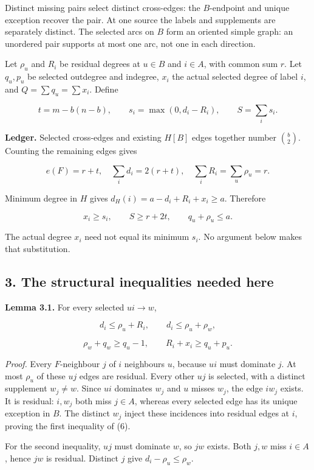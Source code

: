 \documentclass[
  11pt,
  a4paper,
]{article}
\begin{document}
Distinct missing pairs select distinct cross-edges: the \(B\)-endpoint
and unique exception recover the pair. At one source the labels and
supplements are separately distinct. The selected arcs on \(B\) form an
oriented simple graph: an unordered pair supports at most one arc, not
one in each direction.

Let \(\rho_u\) and \(R_i\) be residual degrees at \(u\in B\) and
\(i\in A\), with common sum \(r\). Let \(q_u,p_u\) be selected outdegree
and indegree, \(x_i\) the actual selected degree of label \(i\), and
\(Q=\sum q_u=\sum x_i\). Define

\[t=m-b(n-b),\qquad s_i=\max(0,d_i-R_i),\qquad S=\sum_i s_i.\]

\textbf{Ledger.} Selected cross-edges and existing \(H[B]\) edges
together number \(\binom b2\). Counting the remaining edges gives

\[e(F)=r+t,\quad \sum_i d_i=2(r+t),\quad \sum_iR_i=\sum_u\rho_u=r. \tag{4}\]

Minimum degree in \(H\) gives \(d_H(i)=a-d_i+R_i+x_i\ge a\). Therefore

\[x_i\ge s_i,\qquad S\ge r+2t,\qquad q_u+\rho_u\le a. \tag{5}\]

The actual degree \(x_i\) need not equal its minimum \(s_i\). No
argument below makes that substitution.

\subsection{3. The structural inequalities needed
here}\label{the-structural-inequalities-needed-here}

\textbf{Lemma 3.1.} For every selected \(ui\to w\),

\[d_i\le\rho_u+R_i,\qquad d_i\le\rho_u+\rho_w, \tag{6}\]

\[\rho_w+q_w\ge q_u-1,\qquad R_i+x_i\ge q_u+p_u. \tag{7}\]

\emph{Proof.} Every \(F\)-neighbour \(j\) of \(i\) neighbours \(u\),
because \(ui\) must dominate \(j\). At most \(\rho_u\) of these \(uj\)
edges are residual. Every other \(uj\) is selected, with a distinct
supplement \(w_j\ne w\). Since \(ui\) dominates \(w_j\) and \(u\) misses
\(w_j\), the edge \(iw_j\) exists. It is residual: \(i,w_j\) both miss
\(j\in A\), whereas every selected edge has its unique exception in
\(B\). The distinct \(w_j\) inject these incidences into residual edges
at \(i\), proving the first inequality of (6).

For the second inequality, \(uj\) must dominate \(w\), so \(jw\) exists.
Both \(j,w\) miss \(i\in A\), hence \(jw\) is residual. Distinct \(j\)
give \(d_i-\rho_u\le\rho_w\).
\end{document}
